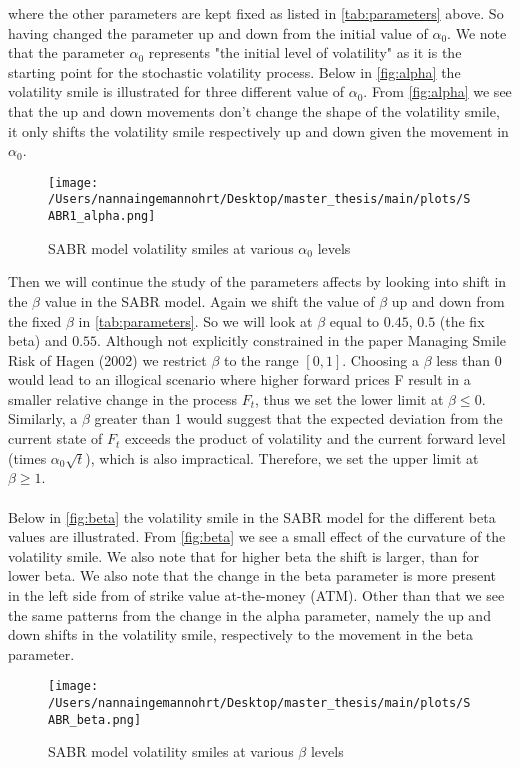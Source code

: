 where the other parameters are kept fixed as listed in \autoref{tab:parameters} above. So having changed the parameter
up and down from the initial value of $\alpha_0$.
We note that the parameter $\alpha_0$
represents "the initial level of volatility" as it is the starting point for the stochastic volatility process. 
Below in \autoref{fig:alpha} the volatility smile is illustrated for three different value of $\alpha_0$. 
From \autoref{fig:alpha} we see that the up and down movements don't change the shape of the volatility smile, 
it only shifts the volatility smile respectively up and down given the movement in $\alpha_0$.
\begin{figure}[H]
    \centering
    \texttt{[image: /Users/nannaingemannohrt/Desktop/master\_thesis/main/plots/SABR1\_alpha.png]}
    \caption{SABR model volatility smiles at various $\alpha_0$ levels}
    \label{fig:alpha}
\end{figure}
\noindent
Then we will continue the study of the parameters affects by looking into shift in the $\beta$ value in the SABR model.
Again we shift the value of $\beta$ up and down from the fixed $\beta$ in \autoref{tab:parameters}. So we will look at $\beta$ equal to $0.45$,
$0.5$ (the fix beta) and $0.55$. 
Although not explicitly constrained in the paper Managing Smile Risk 
of Hagen (2002) \cite{Smile} we restrict $\beta$ to the range $[0, 1]$. 
Choosing a $\beta$ less than 0 would lead to an illogical scenario where higher forward prices F result in a smaller 
relative change in the process $F_t$, thus we set the lower limit at $\beta \leq 0$. Similarly, a $\beta$ greater than 1 would 
suggest that the expected deviation from the current state of $F_t$ exceeds the product of volatility and the current 
forward level (times $\alpha_0 \sqrt{t}$), which is also impractical. Therefore, we set the upper limit at $\beta \geq 1$.
\\\\
Below in \autoref{fig:beta} the volatility smile in the SABR model for the different beta values are illustrated.
From \autoref{fig:beta} we see a small effect of the curvature of the volatility smile. We also note that for higher 
beta the shift is larger, than for lower beta. We also note that the change in the beta parameter is more present in 
the left side from of strike value at-the-money (ATM). Other than that we see the same patterns from the change in 
the alpha parameter, namely the up and down shifts in the volatility smile, respectively to the movement in the 
beta parameter.
\begin{figure}[H]
    \centering
    \texttt{[image: /Users/nannaingemannohrt/Desktop/master\_thesis/main/plots/SABR\_beta.png]}
    \caption{SABR model volatility smiles at various $\beta$ levels}
    \label{fig:beta}
\end{figure}
